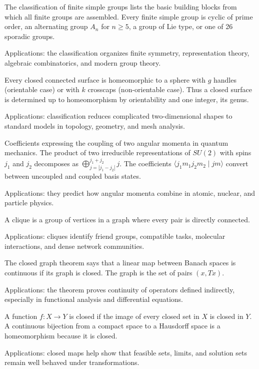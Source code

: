 The classification of finite simple groups lists the basic building blocks from which all finite groups are assembled. Every finite simple group is cyclic of prime order, an alternating group $A_n$ for $n\ge5$, a group of Lie type, or one of 26 sporadic groups. \par\noindent Applications: the classification organizes finite symmetry, representation theory, algebraic combinatorics, and modern group theory.

Every closed connected surface is homeomorphic to a sphere with $g$ handles (orientable case) or with $k$ crosscaps (non-orientable case). Thus a closed surface is determined up to homeomorphism by orientability and one integer, its genus. \par\noindent Applications: classification reduces complicated two-dimensional shapes to standard models in topology, geometry, and mesh analysis.

Coefficients expressing the coupling of two angular momenta in quantum mechanics. The product of two irreducible representations of $SU(2)$ with spins $j_1$ and $j_2$ decomposes as $\bigoplus_{j=|j_1-j_2|}^{j_1+j_2}j$. The coefficients $\langle j_1m_1j_2m_2\mid jm\rangle$ convert between uncoupled and coupled basis states. \par\noindent Applications: they predict how angular momenta combine in atomic, nuclear, and particle physics.

A clique is a group of vertices in a graph where every pair is directly connected.  \par\noindent Applications: cliques identify friend groups, compatible tasks, molecular interactions, and dense network communities.

The closed graph theorem says that a linear map between Banach spaces is continuous if its graph is closed. The graph is the set of pairs $(x,Tx)$. \par\noindent Applications: the theorem proves continuity of operators defined indirectly, especially in functional analysis and differential equations.

A function $f:X\to Y$ is closed if the image of every closed set in $X$ is closed in $Y$. A continuous bijection from a compact space to a Hausdorff space is a homeomorphism because it is closed. \par\noindent Applications: closed maps help show that feasible sets, limits, and solution sets remain well behaved under transformations.

